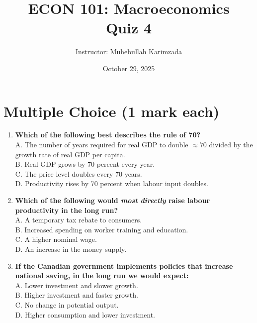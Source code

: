 \documentclass[12pt]{article}
\title{ECON 101: Macroeconomics \\ Quiz 4}
\author{Instructor: Muhebullah Karimzada}
\date{October 29,  2025}
\begin{document}
\maketitle

\section*{Multiple Choice (1 mark each)}

\begin{enumerate}
    \item \textbf{Which of the following best describes the rule of 70?}\\
    A. The number of years required for real GDP to double $\approx 70$ divided by the growth rate of real GDP per capita.\\
    B. Real GDP grows by 70 percent every year.\\
    C. The price level doubles every 70 years.\\
    D. Productivity rises by 70 percent when labour input doubles.\\[4pt]

    \item \textbf{Which of the following would \emph{most directly} raise labour productivity in the long run?}\\
    A. A temporary tax rebate to consumers.\\
    B. Increased spending on worker training and education.\\
    C. A higher nominal wage.\\
    D. An increase in the money supply.\\[4pt]

    \item \textbf{If the Canadian government implements policies that increase national saving, in the long run we would expect:}\\
    A. Lower investment and slower growth.\\
    B. Higher investment and faster growth.\\
    C. No change in potential output.\\
    D. Higher consumption and lower investment.\\[4pt]


\end{enumerate}
\end{document}
